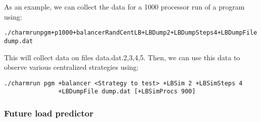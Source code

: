 As an example, we can collect the data for a 1000 processor run of a program using:
\begin{alltt}
./charmrun pgm +p 1000 +balancer RandCentLB +LBDump 2 +LBDumpSteps 4 +LBDumpFile dump.dat
\end{alltt}
This will collect data on files data.dat.{2,3,4,5}. Then, we can use this data to observe various centralized strategies using:
\begin{verbatim}
./charmrun pgm +balancer <Strategy to test> +LBSim 2 +LBSimSteps 4 
               +LBDumpFile dump.dat [+LBSimProcs 900]
\end{verbatim}

\subsubsection{Future load predictor}

